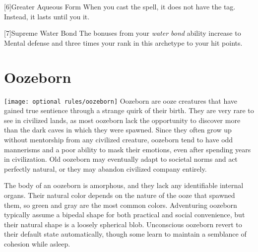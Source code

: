 [6]{Greater Aqueous Form} When you cast the  spell, it does not have the  tag.
Instead, it lasts until you  it.

[7]{Supreme Water Bond} The bonuses from your \textit{water bond} ability increase to  Mental defense and three times your rank in this archetype to your hit points.

\section{Oozeborn}
\texttt{[image: optional rules/oozeborn]}
Oozeborn are ooze creatures that have gained true sentience through a strange quirk of their birth.
They are very rare to see in civilized lands, as most oozeborn lack the opportunity to discover more than the dark caves in which they were spawned.
Since they often grow up without mentorship from any civilized creature, oozeborn tend to have odd mannerisms and a poor ability to mask their emotions, even after spending years in civilization.
Old oozeborn may eventually adapt to societal norms and act perfectly natural, or they may abandon civilized company entirely.

The body of an oozeborn is amorphous, and they lack any identifiable internal organs.
Their natural color depends on the nature of the ooze that spawned them, so green and gray are the most common colors.
Adventuring oozeborn typically assume a bipedal shape for both practical and social convenience, but their natural shape is a loosely spherical blob.
Unconscious oozeborn revert to their default state automatically, though some learn to maintain a semblance of cohesion while asleep.

